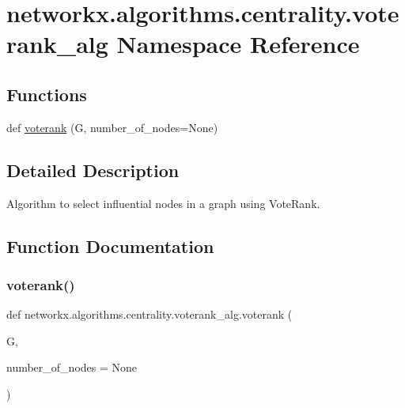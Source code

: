 \hypertarget{namespacenetworkx_1_1algorithms_1_1centrality_1_1voterank__alg}{}\section{networkx.\+algorithms.\+centrality.\+voterank\+\_\+alg Namespace Reference}
\label{namespacenetworkx_1_1algorithms_1_1centrality_1_1voterank__alg}
\subsection*{Functions}
\begin{DoxyCompactItemize}
\item 
def \hyperlink{namespacenetworkx_1_1algorithms_1_1centrality_1_1voterank__alg_a42057702099a060999371be4c9747287}{voterank} (G, number\+\_\+of\+\_\+nodes=None)
\end{DoxyCompactItemize}


\subsection{Detailed Description}
\begin{DoxyVerb}Algorithm to select influential nodes in a graph using VoteRank.\end{DoxyVerb}
 

\subsection{Function Documentation}
\mbox{\label{namespacenetworkx_1_1algorithms_1_1centrality_1_1voterank__alg_a42057702099a060999371be4c9747287}} 
\subsubsection{\texorpdfstring{voterank()}{voterank()}}
{\footnotesize\ttfamily def networkx.\+algorithms.\+centrality.\+voterank\+\_\+alg.\+voterank (\begin{DoxyParamCaption}\item[{}]{G,  }\item[{}]{number\+\_\+of\+\_\+nodes = {\ttfamily None} }\end{DoxyParamCaption})}

